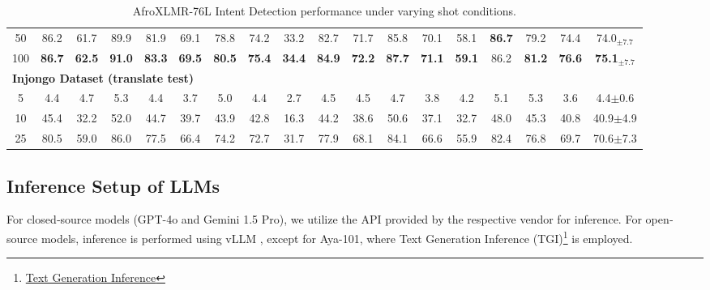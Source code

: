 \begin{table*}[htbp]
{\begin{tabular}{c*{17}{c}}
50 & 86.2 & 61.7 & 89.9 & 81.9 & 69.1 & 78.8 & 74.2 & 33.2 & 82.7 & 71.7 & 85.8 & 70.1 & 58.1 & \textbf{86.7} & 79.2 & 74.4 & 74.0$_{\pm7.7}$ \\
100 & \textbf{86.7} & \textbf{62.5} & \textbf{91.0} & \textbf{83.3} & \textbf{69.5} & \textbf{80.5} & \textbf{75.4} & \textbf{34.4} & \textbf{84.9} & \textbf{72.2} & \textbf{87.7} & \textbf{71.1 }& \textbf{59.1} & 86.2 & \textbf{81.2} & \textbf{76.6} & \textbf{75.1}$_{\pm7.7}$ \\
\midrule
\multicolumn{18}{l}{\textbf{Injongo Dataset (translate test)}} \\
5 & 4.4 & 4.7 & 5.3 & 4.4 & 3.7 & 5.0 & 4.4 & 2.7 & 4.5 & 4.5 & 4.7 & 3.8 & 4.2 & 5.1 & 5.3 & 3.6 & 4.4$\pm$0.6 \\
10 & 45.4 & 32.2 & 52.0 & 44.7 & 39.7 & 43.9 & 42.8 & 16.3 & 44.2 & 38.6 & 50.6 & 37.1 & 32.7 & 48.0 & 45.3 & 40.8 & 40.9$\pm$4.9 \\
25 & 80.5 & 59.0 & 86.0 & 77.5 & 66.4 & 74.2 & 72.7 & 31.7 & 77.9 & 68.1 & 84.1 & 66.6 & 55.9 & 82.4 & 76.8 & 69.7 & 70.6$\pm$7.3 \\
\bottomrule
\end{tabular}%
}
\caption{AfroXLMR-76L Intent Detection performance under varying shot conditions.}
\label{tab:afroxlm76l_intent_detection}
\end{table*}


\subsection{Inference Setup of LLMs}

For closed‐source models (GPT-4o and Gemini 1.5 Pro), we utilize the API provided by the respective vendor for inference. For open‐source models, inference is performed using vLLM \cite{vllm}, except for Aya-101, where Text Generation Inference (TGI)\footnote{\href{https://huggingface.co/docs/text-generation-inference/index}{Text Generation Inference}} is employed.



